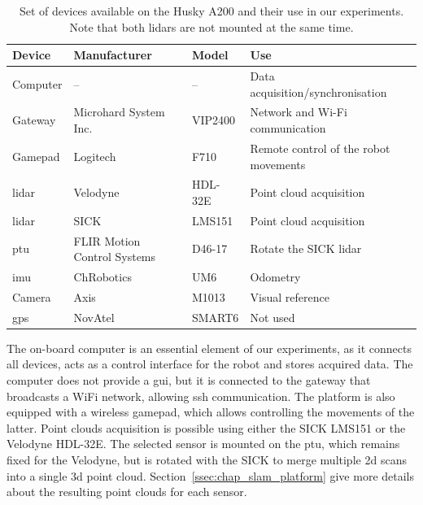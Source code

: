 \begin{table}[H]
    \centering
    \begin{tabular}{@{}llll@{}}
        \toprule
        \textbf{Device} & \textbf{Manufacturer}       & \textbf{Model}  & \textbf{Use}                          \\ \hline
        Computer        & --                          & --              & Data acquisition/synchronisation      \\
        Gateway         & Microhard System Inc.       & VIP2400         & Network and Wi-Fi communication       \\
        Gamepad         & Logitech                    & F710            & Remote control of the robot movements \\
        \gls*{lidar}    & Velodyne                    & HDL-32E         & Point cloud acquisition               \\
        \gls*{lidar}    & SICK                        & LMS151          & Point cloud acquisition               \\
        \gls*{ptu}      & FLIR Motion Control Systems & D46-17          & Rotate the SICK \gls*{lidar}          \\
        \gls*{imu}      & ChRobotics                  & UM6             & Odometry                              \\
        Camera          & Axis                        & M1013           & Visual reference                      \\
        \gls*{gps}      & NovAtel                     & SMART6          & Not used                              \\
        \bottomrule
    \end{tabular}
    \caption{Set of devices available on the Husky A200 and their use in our experiments. Note that both \gls*{lidar}s are not mounted at the same time.}
    \label{tab:husky_devices}
\end{table}

The on-board computer is an essential element of our experiments, as it connects all devices, acts as a control interface for the robot and stores acquired data. The computer does not provide a \gls*{gui}, but it is connected to the gateway that broadcasts a WiFi network, allowing \gls*{ssh} communication. The platform is also equipped with a wireless gamepad, which allows controlling the movements of the latter. Point clouds acquisition is possible using either the SICK LMS151 or the Velodyne HDL-32E. The selected sensor is mounted on the \gls*{ptu}, which remains fixed for the Velodyne, but is rotated with the SICK to merge multiple \gls*{2d} scans into a single \gls*{3d} point cloud. Section~\ref{ssec:chap_slam_platform} give more details about the resulting point clouds for each sensor.

